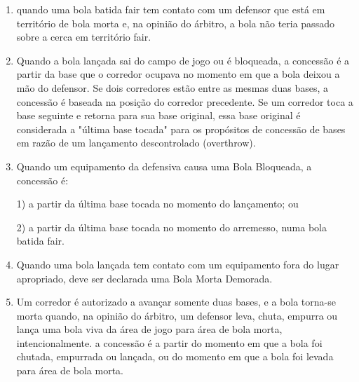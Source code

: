 \begin{enumerate}[label=\roman*.]
\begin{enumerate}[label=\roman*.]
\begin{enumerate}[label=\arabic*)]
			(b) por um corredor, depois de ter passado um defensor, exceto arremessador, e desde que nenhum outro defensor tenha tido uma chance de fazer um \gls{out} e a bola tenha ficado fora de jogo em território \gls{foul}.

			\item  quando uma bola batida \gls{fair} tem contato com um defensor que está em  território de bola morta e, na opinião do árbitro, a bola não teria passado sobre a cerca em território \gls{fair}.


			\item Quando a bola lançada sai do campo de jogo ou é bloqueada, a concessão é a partir da base que o corredor ocupava no momento em que a bola deixou a
			mão do defensor. Se dois corredores estão entre as mesmas duas bases, a concessão é baseada na posição do corredor precedente. Se um corredor toca
			a base seguinte e retorna para sua base original, essa base original é considerada a "última base tocada" para os propósitos de concessão de bases
			em razão de um lançamento descontrolado (\gls{overthrow}).

			\item Quando um equipamento da defensiva causa uma Bola Bloqueada, a concessão é:

			1) a partir da última base tocada no momento do lançamento; ou

			2) a partir da última base tocada no momento do arremesso, numa bola batida \gls{fair}.

			\item  Quando uma bola lançada tem contato com um equipamento fora do lugar apropriado, deve ser declarada uma Bola Morta Demorada.
			\item Um corredor é autorizado a avançar somente duas bases, e a bola torna-se  morta quando, na opinião do árbitro, um defensor leva, chuta, empurra ou lança uma bola viva da área de jogo para área de bola morta, intencionalmente. a  concessão é a partir do momento em que a bola foi chutada, empurrada ou lançada, ou do momento em que a bola foi levada para área de bola morta.
		\end{enumerate}
	\end{enumerate}


\end{enumerate}
